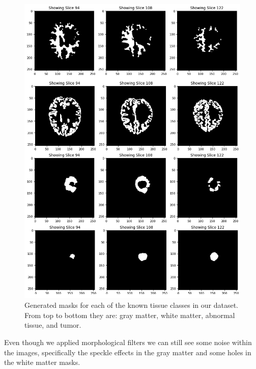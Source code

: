 \begin{figure}[h]
  \centering
  \includegraphics[width=\linewidth]{pictures/resultantMasks.png}
  \caption{Generated masks for each of the known tissue classes in our dataset.  From top to bottom they are: gray matter, white matter, abnormal tissue, and tumor.}
  \label{fig:resultantMasks}
\end{figure}

Even though we applied morphological filters we can still see some noise within the images, specifically the speckle effects in the gray matter and some holes in the white matter masks.\\  

